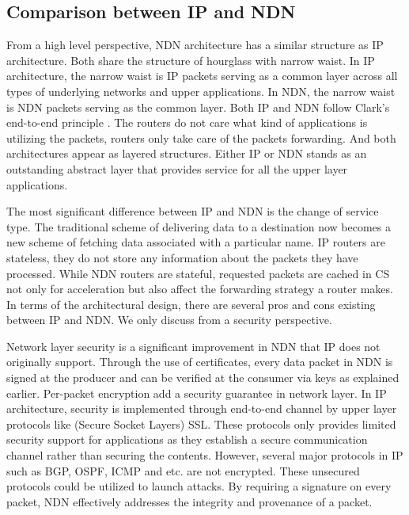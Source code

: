 \documentclass[conference,compsoc]{IEEEtran}
\begin{document}
\subsection{Comparison between IP and NDN}
From a high level perspective, NDN architecture has a similar structure as IP architecture. Both share the structure of hourglass with narrow waist. In IP architecture, the narrow waist is IP packets serving as a common layer across all types of underlying networks and upper applications. In NDN, the narrow waist is NDN packets serving as the common layer. Both IP and NDN follow Clark's end-to-end principle \cite{saltzer1984end}. The routers do not care what kind of applications is utilizing the packets, routers only take care of the packets forwarding. And both architectures appear as layered structures. Either IP or NDN stands as an outstanding abstract layer that provides service for all the upper layer applications.

The most significant difference between IP and NDN is the change of service type. The traditional scheme of delivering data to a destination now becomes a new scheme of fetching data associated with a particular name. IP routers are stateless, they do not store any information about the packets they have processed. While NDN routers are stateful, requested packets are cached in CS not only for acceleration but also affect the forwarding strategy a router makes. In terms of the architectural design, there are several pros and cons existing between IP and NDN. We only discuss from a security perspective.

Network layer security is a significant improvement in NDN that IP does not originally support. Through the use of certificates, every data packet in NDN is signed at the producer and can be verified at the consumer via keys as explained earlier. Per-packet encryption add a security guarantee in network layer. In IP architecture, security is implemented through end-to-end channel by upper layer protocols like (Secure Socket Layers) SSL. These protocols only provides limited security support for applications as they establish a secure communication channel rather than securing the contents. However, several major protocols in IP such as BGP, OSPF, ICMP and etc. are not encrypted. These unsecured protocols could be utilized to launch attacks. By requiring a signature on every packet, NDN  effectively addresses the integrity and provenance of a packet.
\end{document}
